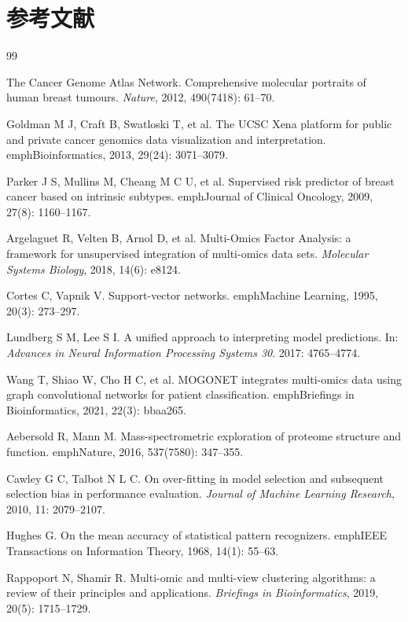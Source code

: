 \section{参考文献}

\begin{thebibliography}{99}

The Cancer Genome Atlas Network.
Comprehensive molecular portraits of human breast tumours.
\emph{Nature}, 2012, 490(7418): 61--70.

Goldman M J, Craft B, Swatloski T, et al.
The UCSC Xena platform for public and private cancer genomics data visualization and interpretation.
emph{Bioinformatics}, 2013, 29(24): 3071--3079.

Parker J S, Mullins M, Cheang M C U, et al.
Supervised risk predictor of breast cancer based on intrinsic subtypes.
emph{Journal of Clinical Oncology}, 2009, 27(8): 1160--1167.

Argelaguet R, Velten B, Arnol D, et al.
Multi-Omics Factor Analysis: a framework for unsupervised integration of multi-omics data sets.
\emph{Molecular Systems Biology}, 2018, 14(6): e8124.

Cortes C, Vapnik V.
Support-vector networks.
emph{Machine Learning}, 1995, 20(3): 273--297.

Lundberg S M, Lee S I.
A unified approach to interpreting model predictions.
In: \emph{Advances in Neural Information Processing Systems 30}. 2017: 4765--4774.

Wang T, Shiao W, Cho H C, et al.
MOGONET integrates multi-omics data using graph convolutional networks for patient classification.
emph{Briefings in Bioinformatics}, 2021, 22(3): bbaa265.

Aebersold R, Mann M.
Mass-spectrometric exploration of proteome structure and function.
emph{Nature}, 2016, 537(7580): 347--355.

Cawley G C, Talbot N L C.
On over-fitting in model selection and subsequent selection bias in performance evaluation.
\emph{Journal of Machine Learning Research}, 2010, 11: 2079--2107.

Hughes G.
On the mean accuracy of statistical pattern recognizers.
emph{IEEE Transactions on Information Theory}, 1968, 14(1): 55--63.

Rappoport N, Shamir R.
Multi-omic and multi-view clustering algorithms: a review of their principles and applications.
\emph{Briefings in Bioinformatics}, 2019, 20(5): 1715--1729.

\end{thebibliography}
